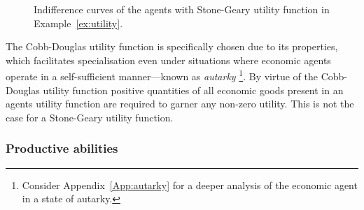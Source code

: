 \begin{figure}[t]
\label{fig:utility}
\begin{center}
\end{center}
\caption[Indifference curves of the agents with Stone-Geary utility function]{Indifference curves of the agents with Stone-Geary utility function in Example~\ref{ex:utility}.}
\end{figure}
The Cobb-Douglas utility function is specifically chosen due to its properties, which facilitates specialisation even under situations where economic agents operate in a self-sufficient manner---known as \emph{autarky} \footnote{Consider Appendix~\ref{App:autarky} for a deeper analysis of the economic agent in a state of autarky.}. By virtue of the Cobb-Douglas utility function positive quantities of all economic goods present in an agents utility function are required to garner any non-zero utility. This is not the case for a Stone-Geary utility function.

\subsubsection{Productive abilities}

